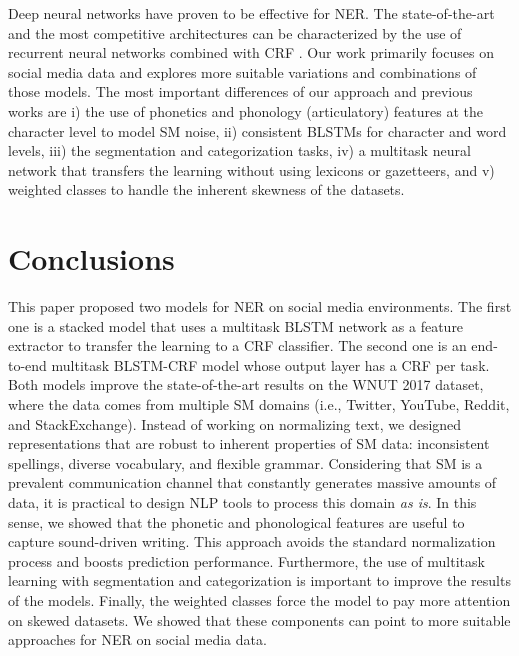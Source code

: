 \documentclass[11pt,a4paper]{article}
\begin{document}
Deep neural networks have proven to be effective for NER. The state-of-the-art and the most competitive architectures can be characterized by the use of recurrent neural networks \citep{DBLP:journals/corr/ChiuN15} combined with CRF \citep{DBLP:journals/corr/LampleBSKD16, MaAndHovy:16, peng-dredze:2016:P16-2, bharadwaj-EtAl:2016:EMNLP2016, AguilarEtAl:17}. Our work primarily focuses on social media data and explores more suitable variations and combinations of those models. The most important differences of our approach and previous works are i) the use of phonetics and phonology (articulatory) features at the character level to model SM noise, ii) consistent BLSTMs for character and word levels, iii) the segmentation and categorization tasks, iv) a multitask neural network that transfers the learning without using lexicons or gazetteers, and v) weighted classes to handle the inherent skewness of the datasets.

\section{Conclusions}
\label{sec:conclusion}
This paper proposed two models for NER on social media environments. The first one is a stacked model that uses a multitask BLSTM network as a feature extractor to transfer the learning to a CRF classifier. The second one is an end-to-end multitask BLSTM-CRF model whose output layer has a CRF per task. Both models improve the state-of-the-art results on the WNUT 2017 dataset, where the data comes from multiple SM domains (i.e., Twitter, YouTube, Reddit, and StackExchange). Instead of working on normalizing text, we designed representations that are robust to inherent properties of SM data: inconsistent spellings, diverse vocabulary, and flexible grammar. Considering that SM is a prevalent communication channel that constantly generates massive amounts of data, it is practical to design NLP tools to process this domain \textit{as is}. In this sense, we showed that the phonetic and phonological features are useful to capture sound-driven writing. This approach avoids the standard normalization process and boosts prediction performance. Furthermore, the use of multitask learning with segmentation and categorization is important to improve the results of the models. Finally, the weighted classes force the model to pay more attention on skewed datasets. We showed that these components can point to more suitable approaches for NER on social media data.


\end{document}
